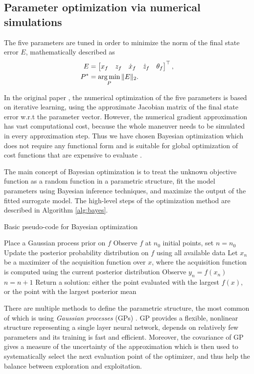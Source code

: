 \subsection{Parameter optimization via numerical simulations}
The five parameters are tuned in order to minimize the norm of the final state error $E$, mathematically described as
\begin{subequations}\label{eq:optim}
\begin{align}
E &= \begin{bmatrix}
x_f & z_f & \dot{x}_f & \dot{z}_f & \theta_f
\end{bmatrix}^\top,\\
P^* &= \operatorname*{arg\,min}_P \|E\|_2.
\end{align} 
\end{subequations}

In the original paper \cite{LSICRA2010}, the numerical optimization of the five parameters is based on iterative learning, using the approximate Jacobian matrix of the final state error w.r.t the parameter vector. However, the numerical gradient approximation has vast computational cost, because the whole maneuver needs to be simulated in every approximation step. Thus we have chosen Bayesian optimization which does not require any functional form and is suitable for global optimization of cost functions that are expensive to evaluate \cite{frazier2018tutorial, bayesopt2, brochu2010tutorial}.

The main concept of Bayesian optimization is to treat the unknown objective function as a random function in a parametric structure, fit the model parameters using Bayesian inference techniques, and maximize the output of the fitted surrogate model. The high-level steps of the optimization method are described in Algorithm \ref{alg:bayes}.
\begin{algorithm}
\caption{Basic pseudo-code for Bayesian optimization \cite{frazier2018tutorial}}
\label{alg:bayes}
\begin{algorithmic}[1]
	\State Place a Gaussian process prior on $f$
    \State Observe $f$ at $n_0$ initial points, set $n=n_0$
    \State Update the posterior probability distribution on $f$ using all available data
    \State Let $x_n$ be a maximizer of the acquisition function over $x$, where the acquisition function is computed using the current posterior distribution
    \State Observe $y_n = f(x_n)$
    \State $n=n+1$
	\EndWhile
	\State Return a solution: either the point evaluated with the largest $f(x)$, or the point with the largest posterior mean
\end{algorithmic}
\end{algorithm}
There are multiple methods to define the parametric structure, the most common of which is using \textit{Gaussian processes} (GPs) \cite{GPMPC2019}. GP provides a flexible, nonlinear structure representing a single layer neural network, depends on relatively few parameters and its training is fast and efficient. Moreover, the covariance of GP gives a measure of the uncertainty of the approximation which is then used to systematically select the next evaluation point of the optimizer, and thus help the balance between exploration and exploitation.

